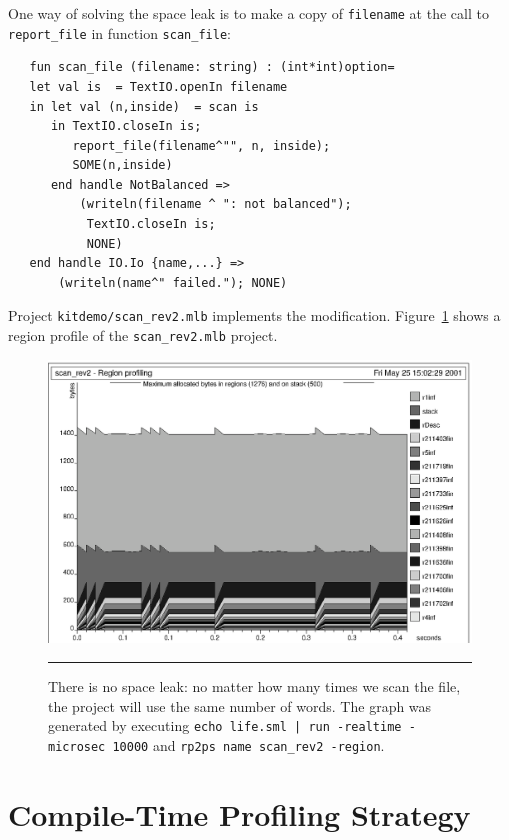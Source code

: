 \documentclass[12pt]{book}
\begin{document}
One way of solving the space leak is to make a copy of {\tt filename}
at the call to {\tt report\_file} in function {\tt scan\_file}:
\begin{verbatim}
   fun scan_file (filename: string) : (int*int)option=
   let val is  = TextIO.openIn filename 
   in let val (n,inside)  = scan is
      in TextIO.closeIn is; 
         report_file(filename^"", n, inside);
         SOME(n,inside)
      end handle NotBalanced => 
          (writeln(filename ^ ": not balanced");
           TextIO.closeIn is;
           NONE)
   end handle IO.Io {name,...} => 
       (writeln(name^" failed."); NONE)
\end{verbatim}
Project 
%
{\tt kitdemo/scan\_rev2.mlb} implements the modification.
Figure~\ref{scan_rev2_1.fig} shows a region profile of the
\texttt{scan\_rev2.mlb} project.
\begin{figure}
\begin{center}
\includegraphics{scan_rev2_1.ps}
\end{center}
\caption{There is no space leak: no matter how many times we scan the
  file, the project will use the same number of words. The graph was
  generated by executing \texttt{echo life.sml | run -realtime -microsec 10000} and \texttt{rp2ps
    name scan\_rev2 -region}.}
\label{scan_rev2_1.fig}
\medskip\hrule
\end{figure}

\section{Compile-Time Profiling Strategy}
\end{document}
